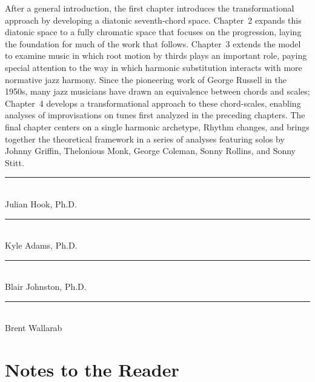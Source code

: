 After a general introduction, the first chapter introduces the
transformational approach by developing a diatonic seventh-chord space.
Chapter~2 expands this diatonic space to a fully chromatic space that focuses
on the \tfo progression, laying the foundation for much of the work that
follows. Chapter~3 extends the model to examine music in which root motion by
thirds plays an important role, paying special attention to the way in which
harmonic substitution interacts with more normative jazz harmony. Since the
pioneering work of George Russell in the 1950s, many jazz musicians have drawn
an equivalence between chords and scales; Chapter~4 develops a
transformational approach to these chord-scales, enabling analyses of
improvisations on tunes first analyzed in the preceding chapters. The final
chapter centers on a single harmonic archetype, Rhythm changes, and brings
together the theoretical framework in a series of analyses featuring solos by
Johnny Griffin, Thelonious Monk, George Coleman, Sonny Rollins, and Sonny
Stitt.

{\flushright \singlespacing

\vspace*{3em}
\rule{20em}{0.5pt} \\ Julian Hook, Ph.D.

\vspace{3em}
\rule{20em}{0.5pt} \\ Kyle Adams, Ph.D.

\vspace{3em}
\rule{20em}{0.5pt} \\ Blair Johnston, Ph.D.

\vspace{3em}
\rule{20em}{0.5pt} \\ Brent Wallarab

}

\cleardoublepage
{}
{}
\singlespacing
\tableofcontents

\clearpage
{}
{}
\listoffigures


\clearpage

{}
\listoftables

\cleardoublepage

\section*{\Large Notes to the Reader}
\label{sec:notes-to-reader}

